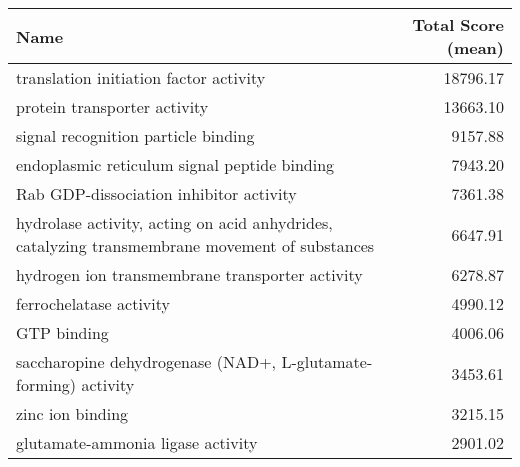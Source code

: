 \begin{table}[hp]
\begin{center} \sf
\begin{tabular}{p{}r}
\toprule
\textbf{Name}                                                                                  & \textbf{Total Score (mean)} \\ \midrule
translation initiation factor activity                                                         & 18796.17                    \\ %
protein transporter activity                                                                   & 13663.10                    \\
signal recognition particle binding                                                            & 9157.88                     \\
endoplasmic reticulum signal peptide binding                                                   & 7943.20                     \\ %
Rab GDP-dissociation inhibitor activity                                                        & 7361.38                     \\
hydrolase activity, acting on acid anhydrides, catalyzing transmembrane movement of substances & 6647.91                     \\
hydrogen ion transmembrane transporter activity                                                & 6278.87                     \\
ferrochelatase activity                                                                        & 4990.12                     \\
GTP binding                                                                                    & 4006.06                     \\
saccharopine dehydrogenase (NAD+, L-glutamate-forming) activity                                & 3453.61                     \\
zinc ion binding                                                                               & 3215.15                     \\
glutamate-ammonia ligase activity                                                              & 2901.02                     \\

\end{tabular}
\end{center}
\end{table}
